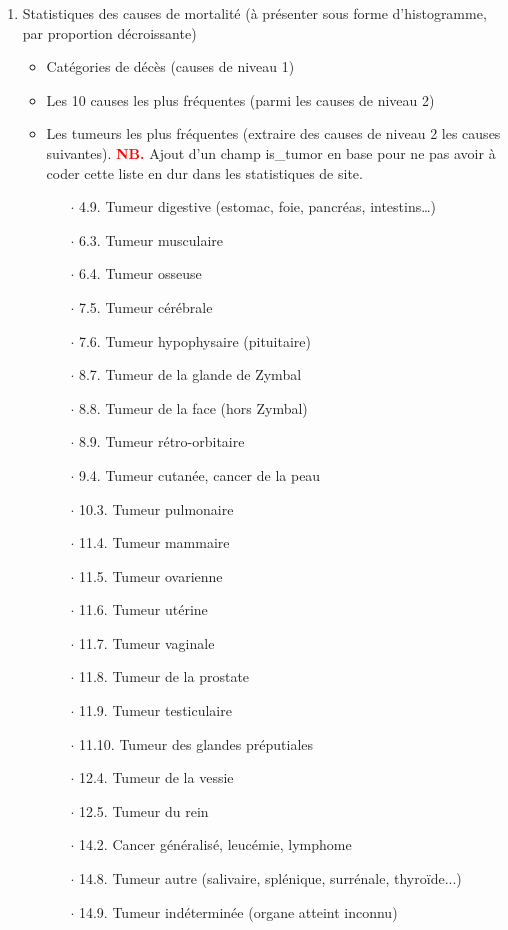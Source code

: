 \documentclass[a4paper,10pt]{article}
\newcommand\desire[1]{\noindent\textbf{\textcolor{red}{#1}}}
\begin{document}
\begin{enumerate}
\item Statistiques des causes de mortalité (à présenter sous forme d'histogramme, par proportion décroissante)
\begin{itemize}
\item Catégories de décès (causes de niveau 1)
\item Les 10 causes les plus fréquentes (parmi les causes de niveau 2)
\item Les tumeurs les plus fréquentes (extraire des causes de niveau 2 les causes suivantes). \desire{NB.} Ajout d'un champ is\_tumor en base pour ne pas avoir à coder cette liste en dur dans les statistiques de site.
 \begin{itemize}
\item[$\cdot$ 4.9.]Tumeur digestive (estomac, foie, pancréas, intestins…)
\item[$\cdot$ 6.3.]Tumeur musculaire
\item[$\cdot$ 6.4.]Tumeur osseuse
\item[$\cdot$ 7.5.]Tumeur cérébrale
\item[$\cdot$ 7.6.]Tumeur hypophysaire (pituitaire)
\item[$\cdot$ 8.7.]Tumeur de la glande de Zymbal
\item[$\cdot$ 8.8.]Tumeur de la face (hors Zymbal)
\item[$\cdot$ 8.9.]Tumeur rétro-orbitaire
\item[$\cdot$ 9.4.]Tumeur cutanée, cancer de la peau
\item[$\cdot$ 10.3.]Tumeur pulmonaire
\item[$\cdot$ 11.4.]Tumeur mammaire
\item[$\cdot$ 11.5.]Tumeur ovarienne
\item[$\cdot$ 11.6.]Tumeur utérine
\item[$\cdot$ 11.7.]Tumeur vaginale
\item[$\cdot$ 11.8.]Tumeur de la prostate
\item[$\cdot$ 11.9.]Tumeur testiculaire
\item[$\cdot$ 11.10.]Tumeur des glandes préputiales
\item[$\cdot$ 12.4.]Tumeur de la vessie
\item[$\cdot$ 12.5.]Tumeur du rein
\item[$\cdot$ 14.2.]Cancer généralisé, leucémie, lymphome
\item[$\cdot$ 14.8.]Tumeur autre (salivaire, splénique, surrénale, thyroïde...) 
\item[$\cdot$ 14.9.]Tumeur indéterminée (organe atteint inconnu)
\end{itemize}
\end{itemize}
\end{enumerate}
\end{document}
